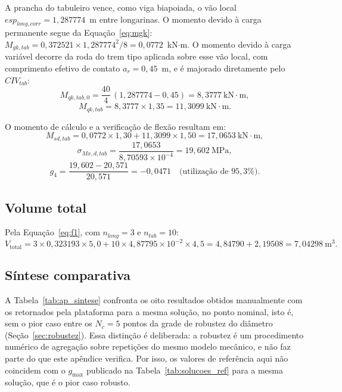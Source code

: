 \begin{appendices}
A prancha do tabuleiro vence, como viga biapoiada, o vão local $esp_{long,corr} = 1{,}287774$~m entre longarinas.
O momento devido à carga permanente segue da Equação~\eqref{eq:mgk}: $M_{gk,tab} = 0{,}372521 \times 1{,}287774^2/8 = 0{,}0772$~kN$\cdot$m.
O momento devido à carga variável decorre da roda do trem tipo aplicada sobre esse vão local, com comprimento efetivo de contato $a_r = 0{,}45$~m, e é majorado diretamente pelo $CIV_{tab}$:
\begin{equation*}
M_{qk,tab,0} = \frac{40}{4}\,(1{,}287774 - 0{,}45) = 8{,}3777~\text{kN}\cdot\text{m},
\end{equation*}
\begin{equation*}
M_{qk,tab} = 8{,}3777 \times 1{,}35 = 11{,}3099~\text{kN}\cdot\text{m}.
\end{equation*}

O momento de cálculo e a verificação de flexão resultam em:
\begin{equation*}
M_{sd,tab} = 0{,}0772\times1{,}30 + 11{,}3099\times1{,}50 = 17{,}0653~\text{kN}\cdot\text{m},
\end{equation*}
\begin{equation*}
\sigma_{Mx,d,tab} = \frac{17{,}0653}{8{,}70593\times10^{-4}} = 19{,}602~\text{MPa},
\end{equation*}
\begin{equation*}
g_4 = \frac{19{,}602 - 20{,}571}{20{,}571} = -0{,}0471 \quad\text{(utilização de } 95{,}3\%\text{)}.
\end{equation*}

\subsection{Volume total}

Pela Equação~\eqref{eq:f1}, com $n_{long} = 3$ e $n_{tab} = 10$:
\begin{equation*}
V_{\mathrm{total}} = 3\times0{,}323193\times5{,}0 + 10\times4{,}87795\times10^{-2}\times4{,}5 = 4{,}84790 + 2{,}19508 = 7{,}04298~\text{m}^3.
\end{equation*}

\subsection{Síntese comparativa}\label{ap:sintese}

A Tabela~\ref{tab:ap_sintese} confronta os oito resultados obtidos manualmente com os retornados pela plataforma para a mesma solução, no ponto nominal, isto é, sem o pior caso entre os $N_c = 5$ pontos da grade de robustez do diâmetro (Seção~\ref{sec:robustez}).
Essa distinção é deliberada: a robustez é um procedimento numérico de agregação sobre repetições do mesmo modelo mecânico, e não faz parte do que este apêndice verifica.
Por isso, os valores de referência aqui não coincidem com o $g_{\max}$ publicado na Tabela~\ref{tab:solucoes_ref} para a mesma solução, que é o pior caso robusto.


\end{appendices}
